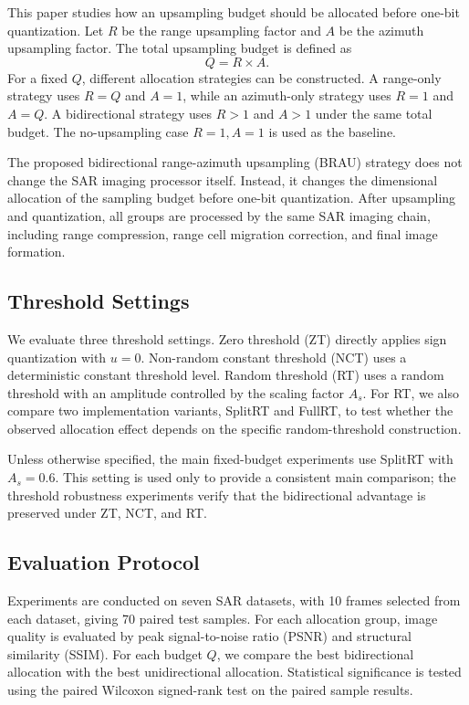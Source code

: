 \documentclass[conference]{IEEEtran}
\begin{document}
This paper studies how an upsampling budget should be allocated before one-bit quantization. Let $R$ be the range upsampling factor and $A$ be the azimuth upsampling factor. The total upsampling budget is defined as
\begin{equation}
    Q = R \times A .
\end{equation}
For a fixed $Q$, different allocation strategies can be constructed. A range-only strategy uses $R=Q$ and $A=1$, while an azimuth-only strategy uses $R=1$ and $A=Q$. A bidirectional strategy uses $R>1$ and $A>1$ under the same total budget. The no-upsampling case $R=1,A=1$ is used as the baseline.

The proposed bidirectional range-azimuth upsampling (BRAU) strategy does not change the SAR imaging processor itself. Instead, it changes the dimensional allocation of the sampling budget before one-bit quantization. After upsampling and quantization, all groups are processed by the same SAR imaging chain, including range compression, range cell migration correction, and final image formation.

\subsection{Threshold Settings}

We evaluate three threshold settings. Zero threshold (ZT) directly applies sign quantization with $u=0$. Non-random constant threshold (NCT) uses a deterministic constant threshold level. Random threshold (RT) uses a random threshold with an amplitude controlled by the scaling factor $A_s$. For RT, we also compare two implementation variants, SplitRT and FullRT, to test whether the observed allocation effect depends on the specific random-threshold construction.

Unless otherwise specified, the main fixed-budget experiments use SplitRT with $A_s=0.6$. This setting is used only to provide a consistent main comparison; the threshold robustness experiments verify that the bidirectional advantage is preserved under ZT, NCT, and RT.

\subsection{Evaluation Protocol}

Experiments are conducted on seven SAR datasets, with 10 frames selected from each dataset, giving 70 paired test samples. For each allocation group, image quality is evaluated by peak signal-to-noise ratio (PSNR) and structural similarity (SSIM). For each budget $Q$, we compare the best bidirectional allocation with the best unidirectional allocation. Statistical significance is tested using the paired Wilcoxon signed-rank test on the paired sample results.
\end{document}
